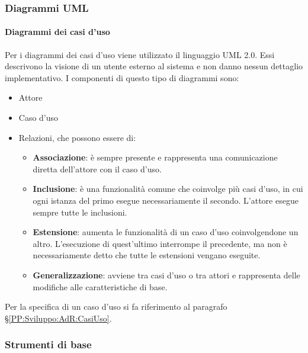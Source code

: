 		\subsubsection{Diagrammi UML}\label{PP:Sviluppo:UML}	%


		\paragraph{Diagrammi dei casi d'uso}\label{DiagrammiCasiUso}
		Per i diagrammi dei casi d'uso viene utilizzato il linguaggio UML 2.0. Essi descrivono la visione di un utente esterno al sistema e non danno
		nessun dettaglio implementativo. I componenti di questo tipo di diagrammi sono:
		\begin{itemize}
			\item Attore
			\item Caso d'uso
			\item Relazioni, che possono essere di:
			\begin{itemize}
				\item \textbf{Associazione}: è sempre presente e rappresenta una comunicazione diretta dell'attore con il caso d'uso.
				\item \textbf{Inclusione}: è una funzionalità comune che coinvolge più casi d'uso, in cui ogni istanza del primo esegue necessariamente il secondo.
					L'attore esegue sempre tutte le inclusioni.
				\item \textbf{Estensione}: aumenta le funzionalità di un caso d'uso coinvolgendone un altro.
					L'esecuzione di quest'ultimo interrompe il precedente, ma non è necessariamente detto che tutte le estensioni vengano eseguite.
				\item \textbf{Generalizzazione}: avviene tra casi d'uso o tra attori e rappresenta delle modifiche alle caratteristiche di base.
			\end{itemize}
		\end{itemize}
		Per la specifica di un caso d'uso si fa riferimento al paragrafo \S\ref{PP:Sviluppo:AdR:CasiUso}.




        \subsubsection{Strumenti di base}\label{PP:Sviluppo:Strumenti}

